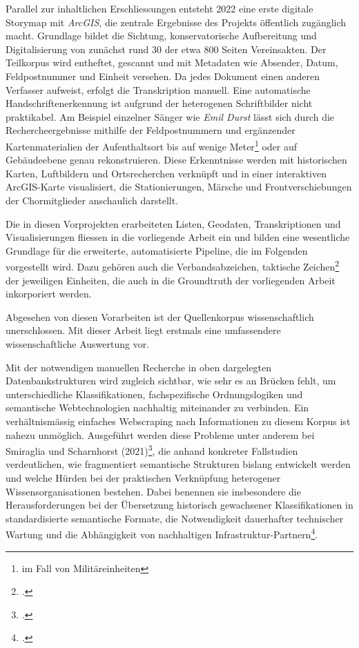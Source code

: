 \documentclass[12pt, a4paper, ngerman, bidi=default]{article}
\let\cite\footcite
\begin{document}
Parallel zur inhaltlichen Erschliessungen entsteht 2022 eine erste digitale Storymap mit \textit{ArcGIS},
die zentrale Ergebnisse des Projekts öffentlich zugänglich macht. Grundlage bildet die Sichtung, konservatorische Aufbereitung und Digitalisierung
von zunächst rund 30 der etwa 800 Seiten Vereinsakten. Der Teilkorpus wird entheftet, gescannt und mit Metadaten wie Absender, Datum,
Feldpostnummer und Einheit versehen. Da jedes Dokument einen anderen Verfasser aufweist, erfolgt die Transkription manuell. Eine automatische Handschriftenerkennung 
ist aufgrund der heterogenen Schriftbilder nicht praktikabel.
Am Beispiel einzelner Sänger wie \textit{Emil Durst} lässt sich durch die Rechercheergebnisse mithilfe der Feldpostnummern und ergänzender Kartenmaterialien der Aufenthaltsort
bis auf wenige Meter\footnote{im Fall von Militäreinheiten} oder auf Gebäudeebene genau rekonstruieren. Diese Erkenntnisse werden mit historischen Karten, Luftbildern und Ortsrecherchen verknüpft
und in einer interaktiven ArcGIS-Karte visualisiert, die Stationierungen, Märsche und Frontverschiebungen der Chormitglieder anschaulich darstellt. 

Die in diesen Vorprojekten erarbeiteten Listen, Geodaten, Transkriptionen und Visualisierungen fliessen in die vorliegende Arbeit ein
und bilden eine wesentliche Grundlage für die erweiterte, automatisierte Pipeline, die im Folgenden vorgestellt wird. Dazu gehören auch die Verbandsabzeichen, 
taktische Zeichen\cite[vgl.][S.64-66]{haupt_buch_1982} der jeweiligen Einheiten, die auch in die Groundtruth der vorliegenden Arbeit inkorporiert werden.

Abgesehen von diesen Vorarbeiten ist der Quellenkorpus wissenschaftlich unerschlossen. Mit dieser Arbeit liegt erstmals eine
umfassendere wissenschaftliche Auswertung vor.

Mit der notwendigen manuellen Recherche in oben dargelegten Datenbankstrukturen wird zugleich sichtbar, wie sehr es an Brücken fehlt, 
um unterschiedliche Klassifikationen, fachspezifische Ordnungslogiken und semantische Webtechnologien nachhaltig miteinander zu verbinden. Ein verhältnismässig einfaches
Webscraping nach Informationen zu diesem Korpus ist nahezu unmöglich. Ausgeführt werden diese Probleme unter anderem bei 
Smiraglia und Scharnhorst (2021)\cite[vgl.][]{richard_linking_2022}, 
 die anhand konkreter Fallstudien verdeutlichen, wie fragmentiert semantische Strukturen bislang entwickelt werden 
 und welche Hürden bei der praktischen Verknüpfung heterogener Wissensorganisationen bestehen. Dabei benennen sie insbesondere die 
 Herausforderungen bei der Übersetzung historisch gewachsener Klassifikationen in standardisierte semantische Formate, 
 die Notwendigkeit dauerhafter technischer Wartung und die Abhängigkeit von nachhaltigen Infrastruktur-Partnern\cite[vgl.][Kap. 2 und 5]{richard_linking_2022}.
\end{document}
